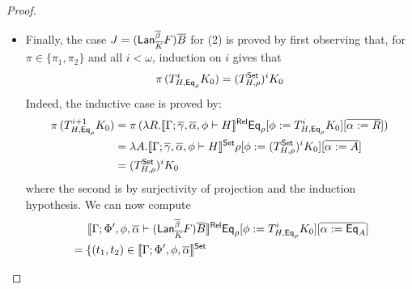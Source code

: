\documentclass[acmsmall,review,anonymous]{acmart}
\theoremstyle{definition}
\begin{document}
\begin{proof}
\begin{itemize}
\begin{itemize}
\item {\color{blue} Finally, the case $J = (\mathsf{Lan}_{\overline{K}}^{\overline{\beta}}
  F)\overline{B}$ for (2) is proved by first observing that, for $\pi \in
  \{\pi_1,\pi_2\}$ and all $i < \omega$, induction on $i$ gives that
\begin{equation}\label{eq:helper-lan}
\pi\, (T^i_{H,\mathsf{Eq}_{\rho}} K_0) = (T^{\mathsf{Set}}_{H,\rho})^i K_0 
\end{equation}
Indeed, the inductive case is proved by:
\begin{align*}
\pi\, (T^{i+1}_{H,\mathsf{Eq}_{\rho}} K_0) &= \pi\,(\lambda R. \llbracket{\Gamma;\overline{\gamma}, \overline{\alpha}, \phi \vdash H}\rrbracket^{\mathsf{Rel}}\mathsf{Eq}_\rho[\phi :=
  T^{i}_{H,\mathsf{Eq}_{\rho}} K_0][\overline{\alpha := R}])\\
&= \lambda A. \llbracket{\Gamma;\overline{\gamma}, \overline{\alpha}, \phi \vdash H}\rrbracket^{\mathsf{Set}}\rho[\phi :=
   (T^{{\mathsf{Set}}}_{H,\rho})^i K_0][\overline{\alpha := A}]\\
&= (T^{\mathsf{Set}}_{H,\rho})^i K_0 
\end{align*}
where the second is by surjectivity of projection and the induction
hypothesis.
We can now compute 
\begin{align*}
&\hspace*{0.2in}\llbracket{\Gamma;\Phi',\phi,\overline{\alpha}
    \vdash (\mathsf{Lan}_{\overline{K}}^{\overline{\beta}} F)\overline{B}}\rrbracket^{\mathsf{Rel}}  \mathsf{Eq}_{\rho} [\phi :=
    T^i_{H,\mathsf{Eq}_{\rho}} K_0] [\overline{\alpha := \mathsf{Eq}_A}]\\
&= \{(t_1,t_2) \in \llbracket{\Gamma;\Phi',\phi,\overline{\alpha}
}\rrbracket^{\mathsf{Set}}
\end{align*}}
\end{itemize}
\end{itemize}
\end{proof}
\end{document}
